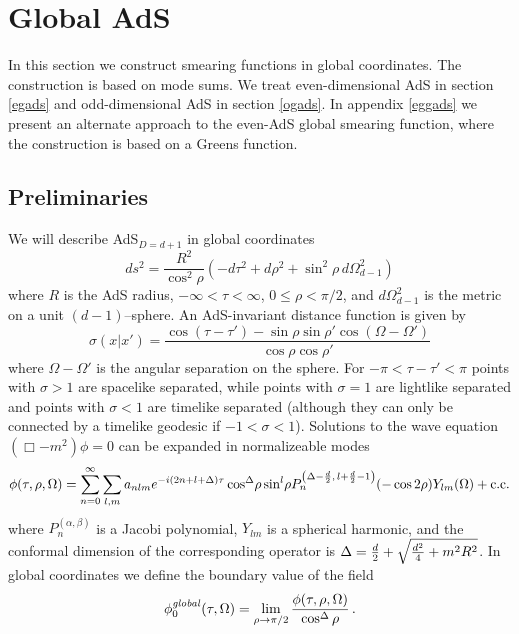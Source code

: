 \documentclass[12pt]{article}
\newcommand{\phinotg} [1]{{\phi_{0#1}^{\it global}}}
\begin{document}
\section{Global AdS} \label{gads} 

In this section we construct smearing functions in global coordinates.
The construction is based on mode sums.  We treat even-dimensional AdS
in section \ref{egads} and odd-dimensional AdS in section \ref{ogads}.
In appendix \ref{eggads} we present an alternate approach to the
even-AdS global smearing function, where the construction is based on
a Greens function.

\subsection{Preliminaries}

We will describe AdS${}_{D = d+1}$ in global coordinates
\begin{equation}
ds^2 = \frac{R^2} { \cos^2 \rho} \left(-d\tau^2 + d\rho^2 + \sin^2 \! \rho \, d\Omega_{d-1}^2\right)
\end{equation}
where $R$ is the AdS radius, $- \infty < \tau < \infty$, $0 \leq \rho < \pi/2$, and $d\Omega_{d-1}^2$ is the
metric on a unit $(d-1)$--sphere.  An AdS-invariant distance function is given by
\begin{equation}
\label{DistanceFtn}
\sigma(x \vert x') = \frac{\cos(\tau - \tau') - \sin \rho \sin \rho' \cos(\Omega - \Omega') }{ \cos \rho \cos \rho'}
\end{equation}
where $\Omega - \Omega'$ is the angular separation on the sphere.  For $- \pi < \tau - \tau' < \pi$ points with $\sigma > 1$
are spacelike separated, while points with $\sigma = 1$ are lightlike separated and points with $\sigma < 1$ are
timelike separated (although they can only be connected by a timelike geodesic if $-1 < \sigma < 1$).  Solutions to the wave
equation $(\Box - m^2)\phi = 0$ can be expanded in normalizeable modes
\begin{equation}
\label{GlobalModes}
\phi(\tau,\rho,\Omega) = \sum_{n = 0}^\infty \sum_{l,m} a_{nlm} e^{-i(2n + l + \Delta)\tau}
\cos^\Delta \! \rho \sin^l \! \rho P_n^{\left(\Delta - \frac{d}{2},\,l + \frac{d}{2} - 1\right)}
(-\cos 2 \rho) Y_{lm}(\Omega)
+ {\rm c.c.}
\end{equation}
where $P_n^{(\alpha,\beta)}$ is a Jacobi polynomial, $Y_{lm}$ is a spherical harmonic, and the conformal dimension of the
corresponding operator is
$\Delta = \frac{d}{2} + \sqrt{{d^2 \over 4} + m^2 R^2}$.  In global coordinates we define the boundary value of the field
\begin{equation}
\label{gbmode}
\phinotg{}(\tau,\Omega) = \lim_{\rho \rightarrow \pi/2} {\phi(\tau,\rho,\Omega) \over \cos^\Delta \rho}\,.
\end{equation}
\end{document}
